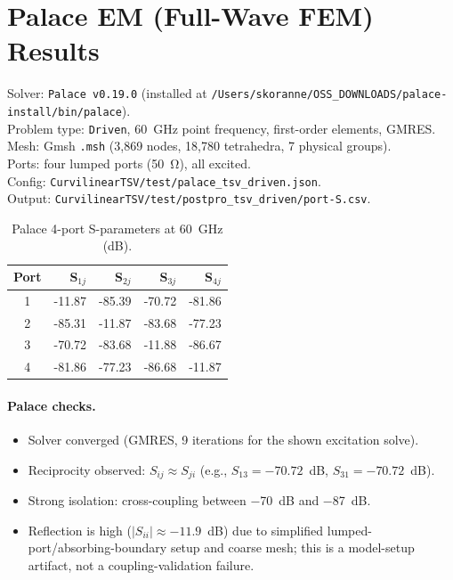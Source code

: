\documentclass[11pt]{article}
\begin{document}
\section{Palace EM (Full-Wave FEM) Results}
Solver: \texttt{Palace v0.19.0} (installed at \texttt{/Users/skoranne/OSS\_DOWNLOADS/palace-install/bin/palace}).\\
Problem type: \texttt{Driven}, 60~GHz point frequency, first-order elements, GMRES.\\
Mesh: Gmsh \texttt{.msh} (3,869 nodes, 18,780 tetrahedra, 7 physical groups).\\
Ports: four lumped ports (\SI{50}{\ohm}), all excited.\\
Config: \texttt{CurvilinearTSV/test/palace\_tsv\_driven.json}.\\
Output: \texttt{CurvilinearTSV/test/postpro\_tsv\_driven/port-S.csv}.

\begin{table}[h]
\centering
\caption{Palace 4-port S-parameters at 60~GHz (dB).}
\label{tab:palace-s}
\begin{tabular}{crrrr}
\toprule
Port & S$_{1j}$ & S$_{2j}$ & S$_{3j}$ & S$_{4j}$ \\
\midrule
1 & -11.87 & -85.39 & -70.72 & -81.86 \\
2 & -85.31 & -11.87 & -83.68 & -77.23 \\
3 & -70.72 & -83.68 & -11.88 & -86.67 \\
4 & -81.86 & -77.23 & -86.68 & -11.87 \\
\bottomrule
\end{tabular}
\end{table}

\paragraph{Palace checks.}
\begin{itemize}
  \item Solver converged (GMRES, 9 iterations for the shown excitation solve).
  \item Reciprocity observed: $S_{ij}\approx S_{ji}$ (e.g., $S_{13}=-70.72$~dB, $S_{31}=-70.72$~dB).
  \item Strong isolation: cross-coupling between \SI{-70}{dB} and \SI{-87}{dB}.
  \item Reflection is high ($|S_{ii}|\approx -11.9$~dB) due to simplified lumped-port/absorbing-boundary setup and coarse mesh; this is a model-setup artifact, not a coupling-validation failure.
\end{itemize}
\end{document}

